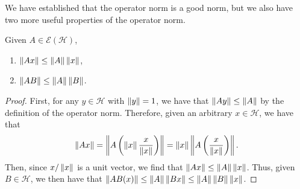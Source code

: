 We have established that the operator norm is a good norm, but we also have two more useful properties
of the operator norm.
\begin{proposition}
    Given $A \in \mathscr{E}(\mathcal{H})$,
    \begin{enumerate}
        \item   $\left\| Ax \right\| \leq \left\| A \right\| \left\| x \right\|$,
        \item   $\left\| AB \right\| \leq \left\| A \right\|\left\| B \right\|$.
    \end{enumerate}
\end{proposition}
\begin{proof}
    First, for any $y \in \mathcal{H}$ with $\left\| y \right\| = 1$, we have that $\left\| Ay \right\| \leq \left\| A \right\|$ by
    the definition of the operator norm. Therefore, given an arbitrary $x \in \mathcal{H}$, we have that
    \[
        \left\| Ax \right\| = \left\| A\left(\left\| x \right\| \frac{x}{\left\| x \right\|}\right) \right\| = \left\| x \right\|
        \left\| A\left(\frac{x}{\left\| x \right\|}\right) \right\|.  
    \]
    Then, since $x/\left\| x \right\|$ is a unit vector, we find that $\left\| Ax \right\| \leq \left\| A \right\|\left\| x \right\|$. Thus,
    given $B \in \mathcal{H}$, we then have that $\left\| AB(x) \right\| \leq \left\| A \right\|\left\| Bx \right\| \leq
    \left\| A \right\|\left\| B \right\|\left\| x \right\|$.
\end{proof}

